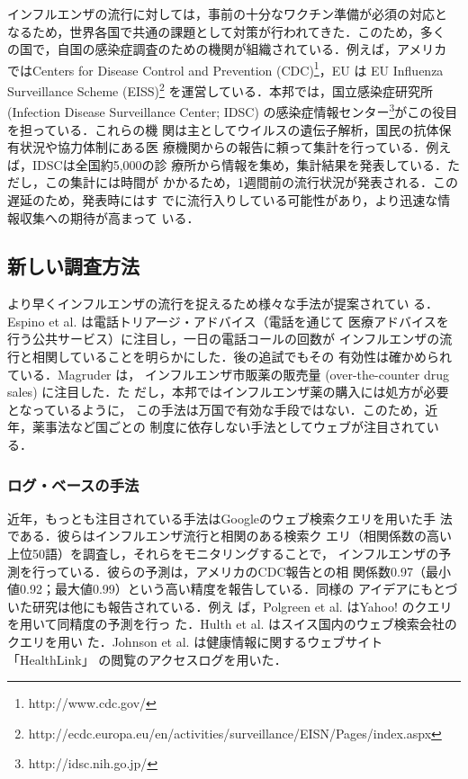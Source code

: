 \documentclass[japanese]{jnlp_1.4}
\begin{document}
インフルエンザの流行に対しては，事前の十分なワクチン準備が必須の対応と
なるため，世界各国で共通の課題として対策が行われてきた．このため，多く
の国で，自国の感染症調査のための機関が組織されている．例えば，アメリカ
ではCenters for Disease Control and Prevention
(CDC)\footnote{http://www.cdc.gov/}，EU は EU Influenza Surveillance
Scheme
(EISS)\footnote{http://ecdc.europa.eu/en/activities/surveillance/EISN/Pages/index.aspx}
を運営している．本邦では，国立感染症研究所 (Infection Disease Surveillance Center; IDSC) 
の感染症情報センター\footnote{http://idsc.nih.go.jp/}がこの役目を担っている．これらの機
関は主としてウイルスの遺伝子解析，国民の抗体保有状況や協力体制にある医
療機関からの報告に頼って集計を行っている．例えば，IDSCは全国約5,000の診
療所から情報を集め，集計結果を発表している．ただし，この集計には時間が
かかるため，1週間前の流行状況が発表される．この遅延のため，発表時にはす
でに流行入りしている可能性があり，より迅速な情報収集への期待が高まって
いる．



\subsection{新しい調査方法}

より早くインフルエンザの流行を捉えるため様々な手法が提案されてい
る．Espino et al. \cite{Espino2003}は電話トリアージ・アドバイス（電話を通じて
医療アドバイスを行う公共サービス）に注目し，一日の電話コールの回数が
インフルエンザの流行と相関していることを明らかにした．後の追試でもその
有効性は確かめられている\cite{Yih2009}．Magruder \citeyear{Magruder2003}は，
インフルエンザ市販薬の販売量 (over-the-counter drug sales) に注目した．た
だし，本邦ではインフルエンザ薬の購入には処方が必要となっているように，
この手法は万国で有効な手段ではない．このため，近年，薬事法など国ごとの
制度に依存しない手法としてウェブが注目されている．


\subsubsection{ログ・ベースの手法}

近年，もっとも注目されている手法はGoogleのウェブ検索クエリを用いた手
法\cite{Ginsberg2009}である．彼らはインフルエンザ流行と相関のある検索ク
エリ（相関係数の高い上位50語）を調査し，それらをモニタリングすることで，
インフルエンザの予測を行っている．彼らの予測は，アメリカのCDC報告との相
関係数0.97（最小値0.92；最大値0.99）という高い精度を報告している．同様の
アイデアにもとづいた研究は他にも報告されている．例え
ば，Polgreen et al. はYahoo! のクエリを用いて同精度の予測を行っ
た\cite{Polgreen2009}．Hulth et al. はスイス国内のウェブ検索会社のクエリを用い
た\cite{Hulth2009}．Johnson et al. は健康情報に関するウェブサイト「HealthLink」
の閲覧のアクセスログを用いた\cite{Johnson2004}．
\end{document}
